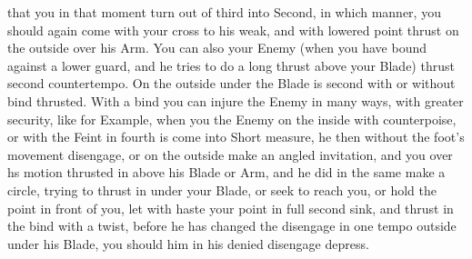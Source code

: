 that you in that moment turn out of third into Second, in which
manner, you should again come with your cross to his weak, and with
lowered point thrust on the outside over his Arm.
You can also your Enemy (when you have bound against a lower guard,
and he tries to do a long thrust above your Blade) thrust second
countertempo. On the outside under the Blade is second with or without
bind thrusted. With a bind you can injure the Enemy in many ways, with
greater security, like for Example, when you the Enemy on the inside
with counterpoise, or with the Feint in fourth is come into Short measure,
he then without the foot's movement disengage, or on the outside make
an angled invitation, and you over hs motion thrusted in above his Blade
or Arm, and he did in the same make a circle,
trying to thrust in under your Blade, or seek to reach you, or hold
the point in front of you, let with haste your point in full second
sink, and thrust in the bind with a twist, before he has changed the
disengage in one tempo outside under his Blade, you should him in his
denied disengage depress.

